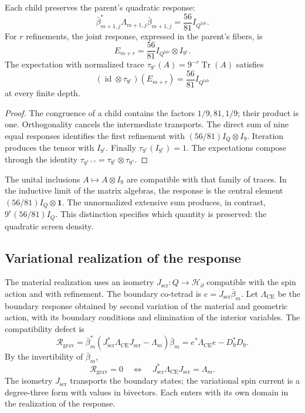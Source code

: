 \begin{theorem}
\label{vii:vii:thm:densidad}
Each child preserves the parent's quadratic response:
\[
 \bar\beta_{m+1,j}^*\Lambda_{m+1,j}\bar\beta_{m+1,j}
 =\frac{56}{81}I_{Q^{\mathrm{lab}}}.
\]
For \(r\) refinements, the joint response, expressed in the parent's
fibers, is
\[
 E_{m+r}=\frac{56}{81}I_{Q^{\mathrm{lab}}}\otimes I_{9^r}.
\]
The expectation with normalized trace
\(\tau_{9^r}(A)=9^{-r}\operatorname{Tr}(A)\) satisfies
\[
 (\operatorname{id}\otimes\tau_{9^r})(E_{m+r})
 =\frac{56}{81}I_{Q^{\mathrm{lab}}}
\]
at every finite depth.
\end{theorem}

\begin{proof}
The congruence of a child contains the factors \(1/9,81,1/9\);
their product is one. Orthogonality cancels the intermediate
transports. The direct sum of nine equal responses identifies
the first refinement with \((56/81)I_Q\otimes I_9\).
Iteration produces the tensor with \(I_{9^r}\).
Finally \(\tau_{9^r}(I_{9^r})=1\). The expectations compose
through the identity
\(\tau_{9^{r+s}}=\tau_{9^r}\otimes\tau_{9^s}\).
\end{proof}

The unital inclusions \(A\mapsto A\otimes I_9\) are compatible with
that family of traces. In the inductive limit of the matrix algebras,
the response is the central element
\((56/81)I_Q\otimes\mathbf1\). The unnormalized extensive sum produces,
in contrast, \(9^r(56/81)I_Q\). This distinction specifies which quantity
is preserved: the quadratic screen density.

\subsection{Variational realization of the response}
\label{vii:vii:sec:realizacion-respuesta}

The material realization uses an isometry
\(J_{\mathrm{scr}}:Q\longrightarrow\mathcal H_\partial\)
compatible with the spin action and with refinement.
The boundary co-tetrad is \(e=J_{\mathrm{scr}}\bar\beta_m\).
Let \(\Lambda_{\mathrm{CE}}\) be the boundary response obtained
by second variation of the material and geometric action, with its
boundary conditions and elimination of the interior variables.
The compatibility defect is
\begin{equation}
 \mathcal R_{\mathrm{grav}}
 =\bar\beta_m^*
   (J_{\mathrm{scr}}^*\Lambda_{\mathrm{CE}}J_{\mathrm{scr}}-\Lambda_m)
   \bar\beta_m
 =e^*\Lambda_{\mathrm{CE}}e-D_9^*D_9.
 \label{vii:vii:eq:defecto-respuesta}
\end{equation}
By the invertibility of \(\bar\beta_m\),
\[
 \mathcal R_{\mathrm{grav}}=0
 \quad\Longleftrightarrow\quad
 J_{\mathrm{scr}}^*\Lambda_{\mathrm{CE}}J_{\mathrm{scr}}=\Lambda_m.
\]
The isometry \(J_{\mathrm{scr}}\) transports the boundary states;
the variational spin current is a degree-three form with values
in bivectors. Each enters with its own domain in the
realization of the response.

